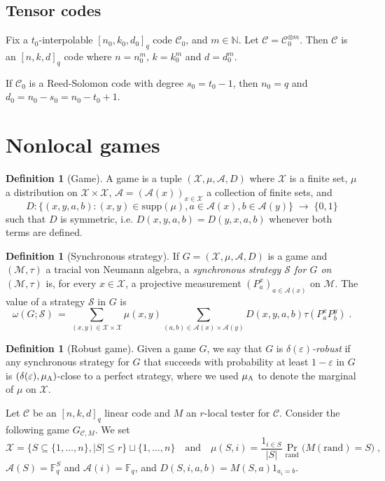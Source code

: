 \documentclass[11pt]{article}
\theoremstyle{definition}
\newtheorem{definition}[theorem]{Definition}
\newcommand{\code}{\mathcal{C}}
\newcommand{\strategy}{\mathscr{S}}
\newcommand{\N}{\ensuremath{\mathbb{N}}}
\newcommand{\F}{\ensuremath{\mathbb{F}}}
\newcommand{\mA}{\ensuremath{\mathcal{A}}}
\newcommand{\mM}{\ensuremath{\mathcal{M}}}
\newcommand{\mX}{\ensuremath{\mathcal{X}}}
\newcommand{\rand}{\textrm{rand}}
\newcommand{\eps}{\varepsilon}
\newcommand{\labelstyle}[1]{\ensuremath{\textsc{#1}}\xspace}
\newcommand{\alice}{\labelstyle{A}}
\begin{document}
\subsection{Tensor codes}

Fix a $t_0$-interpolable $[n_0,k_0,d_0]_q$ code $\code_0$, and $m\in \N$. Let $\code = \code_0^{\otimes m}$. Then $\code$ is an $[n,k,d]_q$ code where $n=n_0^m$, $k=k_0^m$ and $d=d_0^m$. 


If $\code_0$ is a Reed-Solomon code with degree $s_0=t_0-1$, then $n_0=q$ and $d_0=n_0-s_0=n_0-t_0+1$.


\section{Nonlocal games}



\begin{definition}[Game]
A game is a tuple $(\mX,\mu,\mA,D)$ where $\mX$ is a finite set, $\mu$ a distribution on $\mX\times \mX$, $\mA=(\mA(x))_{x\in\mX}$ a collection of finite sets, and 
\[ D: \big\{ (x,y,a,b) : (x,y)\in\text{supp}(\mu),a\in\mA(x),b\in\mA(y)\big\} \;\to\;\{0,1\}\]
such that $D$ is symmetric, i.e. $D(x,y,a,b)=D(y,x,a,b)$ whenever both terms are defined. 
\end{definition}
		
\begin{definition}[Synchronous strategy]
If $G=(\mX,\mu,\mA,D)$ is a game and $(\mM,\tau)$ a tracial von Neumann algebra, a \emph{synchronous strategy $\strategy$ for $G$ on $(\mM,\tau)$} is, for every $x\in \mX$, a projective measurement $(P^x_a)_{a\in \mA(x)}$ on $\mM$. The value of a strategy $\strategy$ in $G$ is 
\[ \omega(G;\strategy)\,=\, \sum_{(x,y)\in\mX\times\mX}\mu(x,y) \sum_{(a,b)\in\mA(x)\times\mA(y)} D(x,y,a,b) \tau(P^x_a P^y_b) \;.\]
\end{definition}

\begin{definition}[Robust game]
Given a game $G$, we say that $G$ is \emph{$\delta(\eps)$-robust} if any synchronous strategy for $G$ that succeeds with probability at least $1-\eps$ in $G$ is $(\delta(\eps),\mu_\alice)$-close to a perfect strategy, where we used $\mu_\alice$ to denote the marginal of $\mu$ on $\mX$.  
\end{definition}

Let $\code$ be an $[n,k,d]_q$ linear code and $M$ an $r$-local tester for $\code$. Consider the following game $G_{\code,M}$. We set 
\[\mX = \{ S\subseteq \{1,\ldots,n\},|S|\leq r\} \sqcup\{1,\ldots,n\}\quad\text{and}\quad \mu(S,i)=\frac{1_{i\in S}}{|S|}\Pr_\rand\big(M(\rand)=S\big)\;,\]
$\mA(S)=\F_q^S$ and $\mA(i)=\F_q$, and $D(S,i,a,b)=M(S,a)1_{a_i=b}$. 
\end{document}
